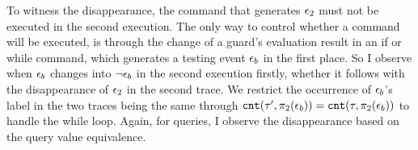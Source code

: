 {{To witness
the disappearance, the command that generates $\mathtt{\epsilon}_2$ must not be executed in 
the second execution. 
The only way to control whether a command will be executed, is through the change of a guard's 
evaluation result in an if or while command, which generates a testing event $\mathtt{\epsilon}_b$ in the first place.
So I observe when
$\mathtt{\epsilon}_b$ changes into $\neg \mathtt{\epsilon}_b$ in the second execution firstly, 
whether it follows with the disappearance of $\mathtt{\epsilon}_2$ in the second trace. We restrict the occurrence of $\mathtt{\epsilon}_b$'s label in the two traces being the same
}
through $\mathtt{cnt}(\mathtt{\tau}', \pi_2(\mathtt{\epsilon}_b)) = \mathtt{cnt}(\mathtt{\tau}, \pi_2(\mathtt{\epsilon}_b))$ to handle the while loop.
Again, for queries, I observe the disappearance based on the query value equivalence.
%
}
